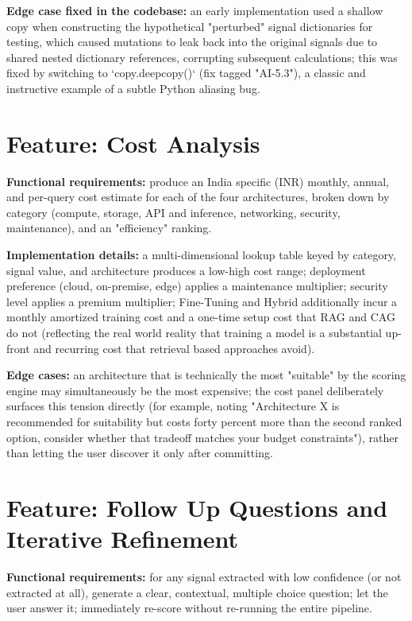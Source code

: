 \documentclass[11pt,a4paper]{report}
\begin{document}
\textbf{Edge case fixed in the codebase:} an early implementation used a shallow copy when constructing the hypothetical "perturbed" signal dictionaries for testing, which caused mutations to leak back into the original signals due to shared nested dictionary references, corrupting subsequent calculations; this was fixed by switching to `copy.deepcopy()` (fix tagged "AI-5.3"), a classic and instructive example of a subtle Python aliasing bug.

\section{Feature: Cost Analysis}

\textbf{Functional requirements:} produce an India specific (INR) monthly, annual, and per-query cost estimate for each of the four architectures, broken down by category (compute, storage, API and inference, networking, security, maintenance), and an "efficiency" ranking.

\textbf{Implementation details:} a multi-dimensional lookup table keyed by category, signal value, and architecture produces a low-high cost range; deployment preference (cloud, on-premise, edge) applies a maintenance multiplier; security level applies a premium multiplier; Fine-Tuning and Hybrid additionally incur a monthly amortized training cost and a one-time setup cost that RAG and CAG do not (reflecting the real world reality that training a model is a substantial up-front and recurring cost that retrieval based approaches avoid).

\textbf{Edge cases:} an architecture that is technically the most "suitable" by the scoring engine may simultaneously be the most expensive; the cost panel deliberately surfaces this tension directly (for example, noting "Architecture X is recommended for suitability but costs forty percent more than the second ranked option, consider whether that tradeoff matches your budget constraints"), rather than letting the user discover it only after committing.

\section{Feature: Follow Up Questions and Iterative Refinement}

\textbf{Functional requirements:} for any signal extracted with low confidence (or not extracted at all), generate a clear, contextual, multiple choice question; let the user answer it; immediately re-score without re-running the entire pipeline.
\end{document}
